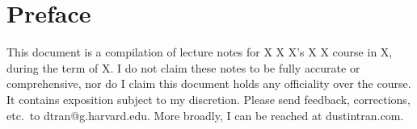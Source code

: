 \documentclass{lecture}
\date{X}
\begin{document}

\frontmatter
\maketitle
\begingroup
\let\cleardoublepage\clearpage
\tableofcontents

\chapter*{Preface}
This document is a compilation of lecture notes for X X X's X X course in X,
during the term of X.  I do not claim these notes to be fully accurate or
comprehensive, nor do I claim this document holds any officiality over
the course. It contains exposition subject to my discretion. Please send
feedback, corrections, etc.\ to {dtran@g.harvard.edu}.  More broadly, I can be
reached at {dustintran.com}.

\mainmatter
\endgroup

%
%

\end{document}
